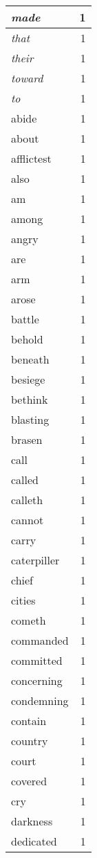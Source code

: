 \begin{center}
\begin{longtable}{l|r}
\emph{made} & 1 \\ \hline
\emph{that} & 1 \\ \hline
\emph{their} & 1 \\ \hline
\emph{toward} & 1 \\ \hline
\emph{to} & 1 \\ \hline
abide & 1 \\ \hline
about & 1 \\ \hline
afflictest & 1 \\ \hline
also & 1 \\ \hline
am & 1 \\ \hline
among & 1 \\ \hline
angry & 1 \\ \hline
are & 1 \\ \hline
arm & 1 \\ \hline
arose & 1 \\ \hline
battle & 1 \\ \hline
behold & 1 \\ \hline
beneath & 1 \\ \hline
besiege & 1 \\ \hline
bethink & 1 \\ \hline
blasting & 1 \\ \hline
brasen & 1 \\ \hline
call & 1 \\ \hline
called & 1 \\ \hline
calleth & 1 \\ \hline
cannot & 1 \\ \hline
carry & 1 \\ \hline
caterpiller & 1 \\ \hline
chief & 1 \\ \hline
cities & 1 \\ \hline
cometh & 1 \\ \hline
commanded & 1 \\ \hline
committed & 1 \\ \hline
concerning & 1 \\ \hline
condemning & 1 \\ \hline
contain & 1 \\ \hline
country & 1 \\ \hline
court & 1 \\ \hline
covered & 1 \\ \hline
cry & 1 \\ \hline
darkness & 1 \\ \hline
dedicated & 1 \\ \hline

\end{longtable}
\end{center}
